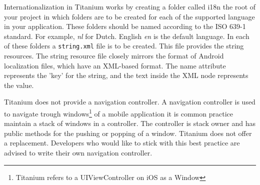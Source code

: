 
Internationalization in Titanium works by creating a folder called i18n the root of your project in which folders are to be created for each of the supported language in your application. These folders should be named according to the  ISO 639-1 standard. For example, \emph{nl} for Dutch. English \emph{en} is the default language.\cite{wiki_ISO639-1} In each of these folders a \texttt{string.xml} file is to be created. This file provides the string resources. The string resource file closely mirrors the format of Android localization files, which have an XML-based format. The name attribute represents the 'key' for the string, and the text inside the XML node represents the value.\cite{TimPoulsen}

Titanium does not provide a navigation controller. A navigation controller is used to navigate trough windows\footnote{Titanium refers to a UIViewController on iOS as a Window} of a mobile application it is common practice maintain a stack of windows in a controller. The controller is stack owner and has public methods for the pushing or popping of a window. 
Titanium does not offer a replacement. Developers who would like to stick with this best practice are advised to write their own navigation controller. %


